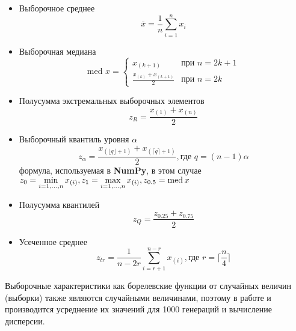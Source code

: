 \documentclass[12pt,a4paper]{article}
\begin{document}
\begin{itemize}
	\item Выборочное среднее
	\begin{equation}\label{8}
	\bar x = \frac{1}{n}\sum_{i=1}^{n}{x_i}
	\end{equation}
	
	\item Выборочная медиана
	\begin{equation}\label{9}
	\text{med }x = 
	\begin{cases}
	x_{(k+1)} &\text{при $n=2k+1$}\\
	\frac{x_{(k)} + x_{(k+1)}}{2} &\text{при $n=2k$}
	\end{cases}
	\end{equation}
	
	\item Полусумма экстремальных выборочных элементов
	\begin{equation}\label{10}
	z_R = \frac{x_{(1)} + x_{(n)}}{2}
	\end{equation}
	
	\item Выборочный квантиль уровня $\alpha$
	\begin{equation}
	z_{\alpha} = \frac{x_{(\lfloor q \rfloor+1)} +
		x_{(\lceil q \rceil+1)}}{2}, \text{где } q=(n-1)\alpha
	\end{equation}
	формула, используемая в \textbf{NumPy}, в этом случае $z_0 = \min\limits_{i=1,...,n}x_{(i)}, z_1 = \max\limits_{i=1,...,n}x_{(i)},
	\newline z_{0.5} = \text{med} \hspace{2pt} x$
	
	\item Полусумма квантилей
	\begin{equation}\label{12}
	z_Q = \frac{z_{0.25} + z_{0.75}}{2}
	\end{equation}
	
	\item Усеченное среднее
	\begin{equation}\label{13}
	z_{tr} = \frac{1}{n-2r}\sum_{i=r+1}^{n-r}x_{(i)}, \text{где } r=\lceil \frac{n}{4} \rceil
	\end{equation}
\end{itemize}

Выборочные характеристики как борелевские функции от случайных величин (выборки) также являются случайными величинами, поэтому в работе и производится усреднение их значений для 1000 генераций и вычисление дисперсии.
\end{document}

